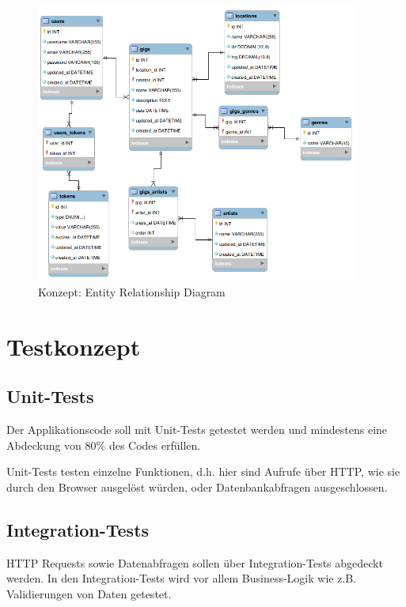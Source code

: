 \begin{figure}[!htb]
  \centering
  \includegraphics[width=0.95\textwidth]{konzept/erd.png}
  \caption{Konzept: Entity Relationship Diagram}
\end{figure}


\clearpage
\section{Testkonzept}\label{testkonzept}

\subsection{Unit-Tests}\label{unittests}

Der Applikationscode soll mit Unit-Tests getestet werden und mindestens eine
Abdeckung von 80\% des Codes erfüllen.

Unit-Tests testen einzelne Funktionen, d.h. hier sind Aufrufe über HTTP, wie
sie durch den Browser ausgelöst würden, oder Datenbankabfragen ausgeschlossen.

\subsection{Integration-Tests}\label{integrationtests}

HTTP Requests sowie Datenabfragen sollen über Integration-Tests abgedeckt
werden. In den Integration-Tests wird vor allem Business-Logik wie z.B.
Validierungen von Daten getestet.

